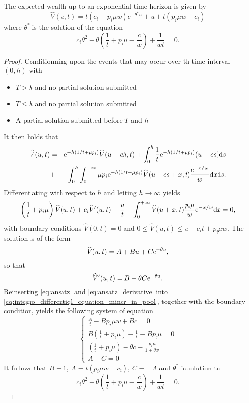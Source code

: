 \begin{prop}\label{prop:rp_hat_miner_in_pool}
The expected wealth up to an exponential time horizon is given by 
\[
\widehat{V}(u,t) = t(c_i-p_i\mu w)e^{-\theta^{\ast} u}+u +t(p_i\mu w - c_i)
\]
where $\theta^{\ast}$ is the solution of the equation
\[
c_i\theta^{2}+\theta\left(\frac{1}{t}+p_i\mu-\frac{c}{w}\right)+\frac{1}{wt} = 0.
\]
\end{prop}
\begin{proof}
Conditionning upon the events that may occur over th time interval $(0,h)$ with 
\begin{itemize}
    \item $T>h$ and no partial solution submitted
    \item $T\leq h$ and no partial solution submitted
    \item A partial solution submitted before $T$ and $h$
\end{itemize}
It then holds that 
\begin{eqnarray*}
\widehat{V}(u,t) &=&\mathrm{e}^{-h(1/t + \mu p_i)}\widehat{V}(u-ch,t)+\int_{0}^{h}\frac{1}{t}\mathrm{e}^{-h(1/t + \mu p_i)}(u-cs)\text{d}s\\
&+& \int_{0}^{h}\int_{0}^{+\infty}\mu p_i\mathrm{e}^{-h(1/t + \mu p_i)}\widehat{V}(u-cs+x,t)\frac{\mathrm{e}^{-x/w}}{w}\text{d}x\text{d}s.
\end{eqnarray*}
Differentiating with respect to $h$ and letting $h\rightarrow\infty$ yields
\begin{equation}\label{eq:integro_differentiql_equation_miner_in_pool}
\left(\frac{1}{t}+p_i\mu\right)\widehat{V}(u,t)+c_i\widehat{V}'(u,t)-\frac{u}{t}-\int_0^{+\infty}\widehat{V}(u+x,t)\frac{p_i\mu}{w}\mathrm{e}^{-x/w}\text{d}x=0,
\end{equation}
with boundary conditions \(\widehat{V}(0,t) = 0\) and \(0\leq \widehat{V}(u,t)\leq u-c_i t +p_i\mu w\). The solution is of the form 
\begin{equation}\label{eq:ansatz}
\widehat{V}(u,t) = A+Bu+C\mathrm{e}^{-\theta u},
\end{equation}
so that 
\begin{equation}\label{eq:ansatz_derivative}
\widehat{V}'(u,t) = B-\theta C\mathrm{e}^{-\theta u}.
\end{equation}
Reinserting \eqref{eq:ansatz} and \eqref{eq:ansatz_derivative} into \eqref{eq:integro_differentiql_equation_miner_in_pool}, together with the boundary condition, yields the following system of equation
\begin{equation}
\begin{cases}
\frac{A}{t}-Bp_i\mu w+Bc =0\\
B\left(\frac{1}{t}+p_i\mu\right)-\frac{1}{t}-Bp_i\mu = 0\\
\left(\frac{1}{t}+p_i\mu\right)-\theta c -\frac{p_i\mu}{1+\theta w}\\
A+C = 0 
\end{cases}
\end{equation}
It follows that $B = 1$, $A = t(p_i\mu w-c_i)$, $C = -A$ and $\theta^{\ast}$ is solution to 
$$
c_i\theta^{2}+\theta\left(\frac{1}{t}+p_i\mu-\frac{c}{w}\right)+\frac{1}{wt} = 0.
$$

\end{proof}


